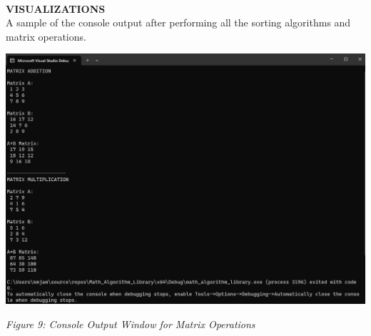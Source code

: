 \documentclass[twoside]{article}
\begin{document}
\noindent \\ \textbf{VISUALIZATIONS}
\\A sample of the console output after performing all the sorting algorithms and matrix operations.\\
\centerline{\includegraphics[scale=0.5]{images/matrixoperations.png}}
\begin{center}\textit{Figure 9: Console Output Window for Matrix Operations}\end{center}
\end{document}
